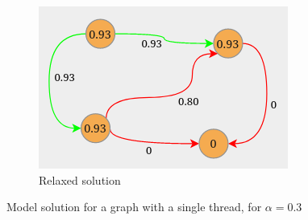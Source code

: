 \documentclass{beamer}
\begin{document}
\begin{frame}[c]
\begin{figure}
\begin{center}
\begin{subfigure}[b]{0.3\textwidth}
				\includegraphics[width=\textwidth]{img/graph-example2-3.png}
				\caption{Relaxed solution}
				\label{fig:img/graph-example1-3.png}
			\end{subfigure}
		\end{center}
		\caption{Model solution for a graph with a single thread, for $\alpha =
				0.3$}
	\end{figure}

\end{frame}
\end{document}
